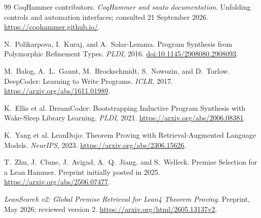 \documentclass[11pt,a4paper]{article}
\theoremstyle{definition}
\theoremstyle{remark}
\begin{document}
\begin{thebibliography}{99}
CoqHammer contributors. \emph{CoqHammer and sauto documentation}.
Unfolding controls and automation interfaces; consulted 21 September 2026.
\url{https://coqhammer.github.io/}.

N.~Polikarpova, I.~Kuraj, and A.~Solar-Lezama.
Program Synthesis from Polymorphic Refinement Types.
\emph{PLDI}, 2016.
\href{https://doi.org/10.1145/2908080.2908093}{doi:10.1145/2908080.2908093}.

M.~Balog, A.~L.~Gaunt, M.~Brockschmidt, S.~Nowozin, and D.~Tarlow.
DeepCoder: Learning to Write Programs.
\emph{ICLR}, 2017. \url{https://arxiv.org/abs/1611.01989}.

K.~Ellis et al.
DreamCoder: Bootstrapping Inductive Program Synthesis with Wake-Sleep Library
Learning. \emph{PLDI}, 2021.
\url{https://arxiv.org/abs/2006.08381}.

K.~Yang et al. LeanDojo: Theorem Proving with Retrieval-Augmented Language Models.
\emph{NeurIPS}, 2023. \url{https://arxiv.org/abs/2306.15626}.

T.~Zhu, J.~Clune, J.~Avigad, A.~Q.~Jiang, and S.~Welleck.
Premise Selection for a Lean Hammer.
Preprint initially posted in 2025.
\url{https://arxiv.org/abs/2506.07477}.

\emph{LeanSearch v2: Global Premise Retrieval for Lean4 Theorem Proving}.
Preprint, May 2026; reviewed version 2.
\url{https://arxiv.org/html/2605.13137v2}.

\end{thebibliography}
\end{document}
